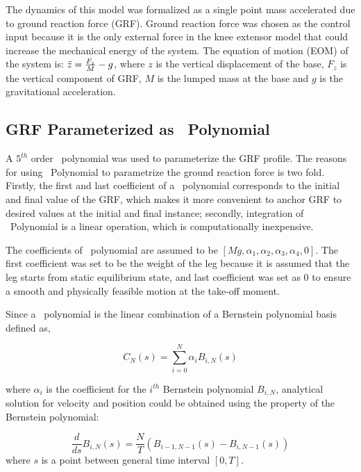 The dynamics of this model was formalized as a single point mass accelerated due to ground reaction force (GRF). Ground reaction force was chosen as the control input because it is the only external force in the knee extensor model that could increase the mechanical energy of the system. The equation of motion (EOM) of the system is: ${\ddot{z}} = \frac{F_z}{M}-g$, where $z$ is the vertical displacement of the base, $F_z$ is the vertical component of GRF, $M$ is the lumped mass at the base and $g$ is the gravitational acceleration. 

\subsection{GRF Parameterized as \Bezier\ Polynomial}
\label{sec:BezierPoly}
	
A $5^{th}$ order \Bezier\ polynomial was used to parameterize the GRF profile. The reasons for using \Bezier\ Polynomial to parametrize the ground reaction force is two fold. Firstly, the first and last coefficient of a \Bezier\ polynomial corresponds to the initial and final value of the GRF, which makes it more convenient to anchor GRF to desired values at the initial and final instance; secondly, integration of \Bezier\ Polynomial is a linear operation, which is computationally inexpensive.

The coefficients of \Bezier\ polynomial are assumed to be $[Mg, \alpha_1, \alpha_2, \alpha_3, \alpha_4, 0]$. The first coefficient was set to be the weight of the leg because it is assumed that the leg starts from static equilibrium state, and last coefficient was set as $0$ to ensure a smooth and physically feasible motion at the take-off moment.  

Since a \Bezier\ polynomial is the linear combination of a Bernstein polynomial basis\cite{dicsibuyuk2007generalization} defined as,

\begin{equation}\label{eq:bezier}
C_N(s) = \sum_{i=0}^{N}\alpha_i B_{i,N}(s)
\end{equation}

where $\alpha_i$ is the coefficient for the $i^{th}$ Bernstein polynomial $B_{i,N}$, analytical solution for velocity and position could be obtained using the property of the Bernstein polynomial\cite{Doha2011}:

\begin{equation} \label{eq:bernstein_diff}
\frac{d}{ds}B_{i,N}(s)=\frac{N}{T}(B_{i-1,N-1}(s)-B_{i,N-1}(s))
\end{equation}
where $s$ is a point between general time interval $[0, T]$.

